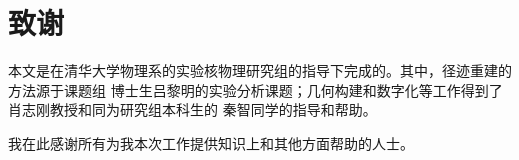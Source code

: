 \chapter*{致谢}
本文是在清华大学物理系的实验核物理研究组的指导下完成的。其中，径迹重建的方法源于课题组
博士生吕黎明的实验分析课题；几何构建和数字化等工作得到了肖志刚教授和同为研究组本科生的
秦智同学的指导和帮助。

我在此感谢所有为我本次工作提供知识上和其他方面帮助的人士。
\cleardoublepage
